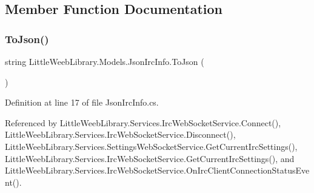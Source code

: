 \subsection{Member Function Documentation}
\mbox{\label{class_little_weeb_library_1_1_models_1_1_json_irc_info_af7d4dd885c7289ca28b0147d4feb2b84}} 
\subsubsection{\texorpdfstring{To\+Json()}{ToJson()}}
{\footnotesize\ttfamily string Little\+Weeb\+Library.\+Models.\+Json\+Irc\+Info.\+To\+Json (\begin{DoxyParamCaption}{ }\end{DoxyParamCaption})}



Definition at line 17 of file Json\+Irc\+Info.\+cs.



Referenced by Little\+Weeb\+Library.\+Services.\+Irc\+Web\+Socket\+Service.\+Connect(), Little\+Weeb\+Library.\+Services.\+Irc\+Web\+Socket\+Service.\+Disconnect(), Little\+Weeb\+Library.\+Services.\+Settings\+Web\+Socket\+Service.\+Get\+Current\+Irc\+Settings(), Little\+Weeb\+Library.\+Services.\+Irc\+Web\+Socket\+Service.\+Get\+Current\+Irc\+Settings(), and Little\+Weeb\+Library.\+Services.\+Irc\+Web\+Socket\+Service.\+On\+Irc\+Client\+Connection\+Status\+Event().


